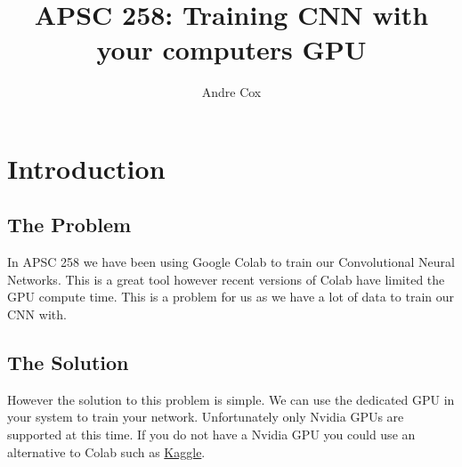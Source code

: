 \documentclass[11pt]{report}
\begin{document}
    
\title{APSC 258: Training CNN with your computers GPU}
\author{Andre Cox}


\maketitle
\tableofcontents

\chapter{Introduction}
\section{The Problem}
In APSC 258 we have been using Google Colab to train our Convolutional Neural Networks. 
This is a great tool however recent versions of Colab have limited the GPU compute time.
This is a problem for us as we have a lot of data to train our CNN with. 
\section{The Solution}
However the solution to this problem is simple. We can use the dedicated GPU in your system to train your network.
Unfortunately only Nvidia GPUs are supported at this time. If you do not have a Nvidia GPU you could use an alternative to Colab such as \href{https://www.kaggle.com/}{Kaggle}. 
\end{document}
